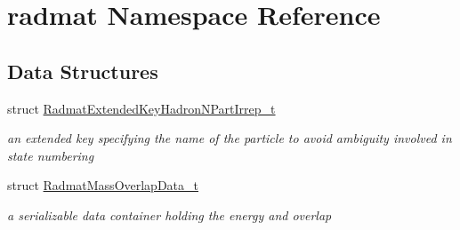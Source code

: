 \hypertarget{namespaceradmat}{}\section{radmat Namespace Reference}
\label{namespaceradmat}
\subsection*{Data Structures}
\begin{DoxyCompactItemize}
\item 
struct \mbox{\hyperlink{structradmat_1_1RadmatExtendedKeyHadronNPartIrrep__t}{Radmat\+Extended\+Key\+Hadron\+N\+Part\+Irrep\+\_\+t}}
\begin{DoxyCompactList}\small\item\em an extended key specifying the name of the particle to avoid ambiguity involved in state numbering \end{DoxyCompactList}\item 
struct \mbox{\hyperlink{structradmat_1_1RadmatMassOverlapData__t}{Radmat\+Mass\+Overlap\+Data\+\_\+t}}
\begin{DoxyCompactList}\small\item\em a serializable data container holding the energy and overlap \end{DoxyCompactList}\end{DoxyCompactItemize}
